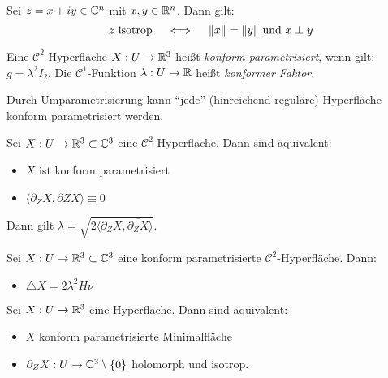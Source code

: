 \documentclass{cheat-sheet}
\begin{document}

\begin{lem}
  Sei $z = x + iy \in \mathbb{C}^n$ mit $x, y \in \mathbb{R}^n$. Dann gilt:
  \[ z \text{ isotrop} \quad \iff \quad \lVert x\rVert = \lVert y\rVert \text{ und } x \perp y \]
\end{lem}

\begin{definition}
  Eine $\mathcal{C}^2$-Hyperfläche $X : U \to \mathbb{R}^3$ heißt \emph{konform parametrisiert}, wenn gilt: $g = \lambda^2 I_2$. Die $\mathcal{C}^1$-Funktion $\lambda : U \to \mathbb{R}$ heißt \emph{konformer Faktor}.
\end{definition}

\begin{bem}
  Durch Umparametrisierung kann "`jede"' (hinreichend reguläre) Hyperfläche konform parametrisiert werden.
\end{bem}

\begin{lem}
  Sei $X : U \to \mathbb{R}^3 \subset \mathbb{C}^3$ eine $\mathcal{C}^2$-Hyperfläche. Dann sind äquivalent:
  \begin{itemize}
    \item $X$ ist konform parametrisiert
    \item $\langle \partial_Z X, \partial Z X \rangle \equiv 0$
  \end{itemize}
  Dann gilt $\lambda = \sqrt{2 \langle \partial_Z X , \overline{\partial_Z X} \rangle}$.
\end{lem}

\begin{lem}
  Sei $X : U \to \mathbb{R}^3 \subset \mathbb{C}^3$ eine konform parametrisierte $\mathcal{C}^2$-Hyperfläche. Dann:
  \begin{itemize}
    \item $\triangle X = 2 \lambda^2 H \nu$ %
  \end{itemize}
\end{lem}

\begin{lem}
  Sei $X : U \to \mathbb{R}^3$ eine Hyperfläche. Dann sind äquivalent:
  \begin{itemize}
    \item $X$ konform parametrisierte Minimalfläche
    \item $\partial_Z X : U \to \mathbb{C}^3 \setminus \{ 0 \}$ holomorph und isotrop.
  \end{itemize}
\end{lem}
\end{document}
